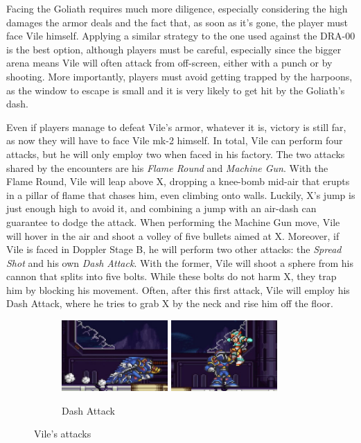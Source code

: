 Facing the Goliath requires much more diligence, especially considering the high damages the armor deals and the fact that, as soon as it's gone, the player must face Vile himself. Applying a similar strategy to the one used against the DRA-00 is the best option, although players must be careful, especially since the bigger arena means Vile will often attack from off-screen, either with a punch or by shooting. More importantly, players must avoid getting trapped by the harpoons, as the window to escape is small and it is very likely to get hit by the Goliath's dash.

Even if players manage to defeat Vile's armor, whatever it is, victory is still far, as now they will have to face Vile mk-2 himself. In total, Vile can perform four attacks, but he will only employ two when faced in his factory. The two attacks shared by the encounters are his \emph{Flame Round} and \emph{Machine Gun}. With the Flame Round, Vile will leap above X, dropping a knee-bomb mid-air that erupts in a pillar of flame that chases him, even climbing onto walls. Luckily, X's jump is just enough high to avoid it, and combining a jump with an air-dash can guarantee to dodge the attack. When performing the Machine Gun move, Vile will hover in the air and shoot a volley of five bullets aimed at X. Moreover, if Vile is faced in Doppler Stage B, he will perform two other attacks: the \emph{Spread Shot} and his own \emph{Dash Attack}. With the former, Vile will shoot a sphere from his cannon that splits into five bolts. While these bolts do not harm X, they trap him by blocking his movement. Often, after this first attack, Vile will employ his Dash Attack, where he tries to grab X by the neck and rise him off the floor.
\begin{figure}[htp]
	\ContinuedFloat
	\centering
	\begin{subfigure}{\linewidth}
		\centering
		\includegraphics[height=2.7cm]{figures/X3/Doppler_stages/vile_dash_1.jpg}
		\includegraphics[height=2.7cm]{figures/X3/Doppler_stages/vile_dash_2.jpg}
		\caption{Dash Attack}
	\end{subfigure}
	\caption{Vile's attacks}
\end{figure}


